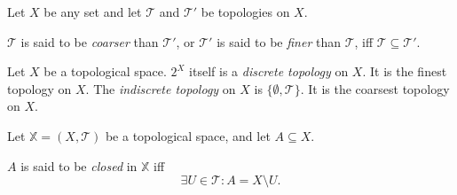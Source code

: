 \begin{definition}
	Let $X$ be any set and let $\mathcal T$ and $\mathcal T'$ be topologies on $X$.
	
	$\mathcal T$ is said to be \textit{coarser} than $\mathcal T'$, or $\mathcal T'$ is said to be \textit{finer} than $\mathcal T$, iff $\mathcal T \subseteq \mathcal T'$.
\end{definition}


\begin{example}
	Let $X$ be a topological space. $2^X$ itself is a \textit{discrete topology} on $X$. It is the finest topology on $X$. The \textit{indiscrete topology} on $X$ is $\{ \emptyset, \mathcal T \}$. It is the coarsest topology on $X$.
\end{example}


\begin{definition}
	\label{def: closed sets}
	Let $\mathbb X = (X, \mathcal T)$ be a topological space, and let $A \subseteq X$.
	
	$A$ is said to be \textit{closed} in $\mathbb X$ iff
	$$
	\exists U \in \mathcal T: A = X \setminus U.
	$$
\end{definition}


